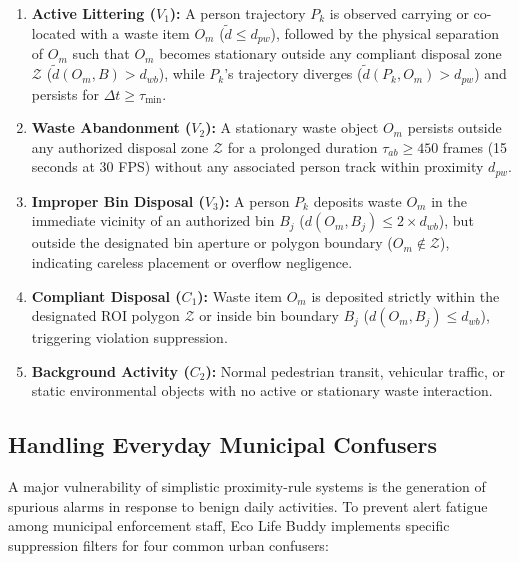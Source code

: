 \documentclass[conference]{IEEEtran}
\begin{document}
\begin{enumerate}
\item \textbf{Active Littering ($V_1$):} A person trajectory $P_k$ is observed carrying or co-located with a waste item $O_m$ ($\tilde{d} \leq d_{pw}$), followed by the physical separation of $O_m$ such that $O_m$ becomes stationary outside any compliant disposal zone $\mathcal{Z}$ ($\tilde{d}(O_m, B) > d_{wb}$), while $P_k$'s trajectory diverges ($\tilde{d}(P_k, O_m) > d_{pw}$) and persists for $\Delta t \geq \tau_{\min}$.
\item \textbf{Waste Abandonment ($V_2$):} A stationary waste object $O_m$ persists outside any authorized disposal zone $\mathcal{Z}$ for a prolonged duration $\tau_{ab} \geq 450$ frames (15 seconds at 30 FPS) without any associated person track within proximity $d_{pw}$.
\item \textbf{Improper Bin Disposal ($V_3$):} A person $P_k$ deposits waste $O_m$ in the immediate vicinity of an authorized bin $B_j$ ($d(O_m, B_j) \leq 2 \times d_{wb}$), but outside the designated bin aperture or polygon boundary ($O_m \notin \mathcal{Z}$), indicating careless placement or overflow negligence.
\item \textbf{Compliant Disposal ($C_1$):} Waste item $O_m$ is deposited strictly within the designated ROI polygon $\mathcal{Z}$ or inside bin boundary $B_j$ ($d(O_m, B_j) \leq d_{wb}$), triggering violation suppression.
\item \textbf{Background Activity ($C_2$):} Normal pedestrian transit, vehicular traffic, or static environmental objects with no active or stationary waste interaction.
\end{enumerate}

\subsection{Handling Everyday Municipal Confusers}

A major vulnerability of simplistic proximity-rule systems is the generation of spurious alarms in response to benign daily activities. To prevent alert fatigue among municipal enforcement staff, Eco Life Buddy implements specific suppression filters for four common urban confusers:
\end{document}
